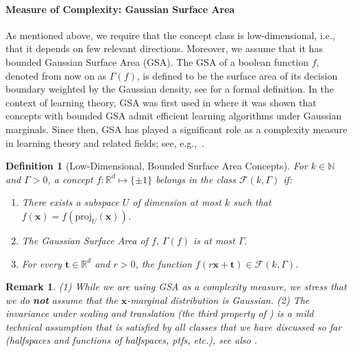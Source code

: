 \documentclass[10pt,a4paper]{article}
\newtheorem{definition}{Definition}[section]
\newtheorem{remark}{Remark}[section]
\renewcommand\vec[1]{\mathbf{#1}}
\newcommand{\proj}{\mathrm{proj}}
\newcommand{\R}{\mathbb{R}}
\newcommand{\1}{\Ind}
\newcommand{\x}{\vec x}
\begin{document}
\paragraph{Measure of Complexity: Gaussian Surface Area}
As mentioned above, we require that the concept class is low-dimensional, i.e., that it depends on few relevant directions.  Moreover, we assume that it has bounded Gaussian Surface Area (GSA).  The GSA of a boolean function $f$, denoted from now on as $\Gamma(f)$, 
is defined to be the surface area of its decision boundary weighted by the Gaussian density, see  for a formal definition. In the context of learning theory, GSA was first used in \cite{KOS:08}  where it was shown that concepts with bounded GSA admit efficient learning algorithms under Gaussian marginals. Since then, GSA has played a significant role as a complexity measure in learning theory and related fields; see, e.g.,~\cite{Kane11, Neeman14, KTZ19, DeMN21}.  
\begin{definition}[Low-Dimensional, Bounded Surface Area Concepts]
\label{def:bounded-surface-area-concepts}
For $k \in \mathbb N$ and $\Gamma > 0$,  a concept $f:\R^d \mapsto \{\pm 1\}$ belongs in the class $\mathcal{F}(k, \Gamma)$ if:
\begin{enumerate}
\item There exists a subspace $U$ of dimension at most $k$ such that $f(\x) = f(\proj_U(\x))$.
\item The Gaussian Surface Area of $f$, $\Gamma(f)$ is at most $\Gamma$.
\item For every $\vec t \in \R^d$ and $r>0$, the function $f(r \x + \vec t) \in \mathcal F(k, \Gamma)$.
\end{enumerate}

\end{definition}
\begin{remark}
(1) While we are using GSA as a complexity measure, we stress that we do {\bf not} assume that the $\x$-marginal distribution is Gaussian.  
(2) The invariance under scaling and translation (the third property of ) is a mild technical assumption that is satisfied by all classes that we have discussed so far (halfspaces and functions of halfspaces, ptfs, etc.), see also .
\end{remark}
\end{document}
